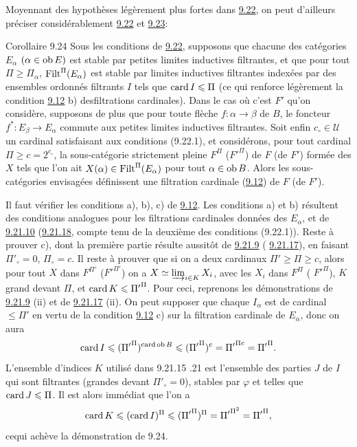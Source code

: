 \documentclass[10pt]{../fichiers-configuration-latex/smfart}
\begin{document}
Moyennant des hypothèses légèrement plus fortes dans
\hyperref[I.them9.22]{9.22}, on peut
d'ailleurs préciser considérablement \hyperref[I.them9.22]{9.22} et
\hyperref[I.cor9.23]{9.23}:

\begin{enonce*}{Corollaire 9.24}
Sous les conditions de \hyperref[I.them9.22]{9.22}, supposons que chacune des
catégories
$E_{\alpha}$ $(\alpha\in \operatorname{ob} E)$ est stable par petites limites
inductives filtrantes, et que pour tout $\Pi\geq \Pi_{\alpha}$,
$\operatorname{Filt}^{\Pi}(E_{\alpha})$ est stable par limites inductives
filtrantes indexées par des ensembles ordonnés filtrants $I$ tels
que $\operatorname{card} I\leqslant \Pi$ (ce qui renforce légèrement la condition
\hyperref[I.def9.12]{9.12} {\rm b)} des\pageoriginale filtrations cardinales). Dans le
cas où c'est $F'$ qu'on considère, supposons de plus que pour toute
flèche $f:\alpha\rightarrow \beta$ de $B$, le foncteur
$f^\ast:E_{\beta}\rightarrow E_{\alpha}$ commute aux petites limites
inductives filtrantes. Soit enfin $c_{\circ}\in 𝒰$ un
cardinal satisfaisant aux conditions (9.22.1), et considérons,
pour tout cardinal $\Pi\geq c=2^{c_{\circ}}$, la sous-catégorie
strictement pleine $F^{\Pi}$ (\resp ${F'}^{\Pi}$) de $F$ (\resp de
$F'$) formée des $X$ tels que l'on ait $X(\alpha)\in
\operatorname{Filt}^{\Pi}(E_{\alpha})$ pour tout $\alpha\in \operatorname{ob} B$. Alors les
sous-catégories envisagées définissent une filtration cardinale
(\hyperref[I.def9.12]{9.12}) de $F$ (\resp de $F'$).
\end{enonce*}

Il faut vérifier les conditions a), b), c) de \hyperref[I.def9.12]{9.12}. Les
conditions
a) et b) résultent des conditions analogues pour les filtrations
cardinales données des $E_{\alpha}$, et de \hyperref[I.lem9.21.10]{9.21.10}
(\resp\hyperref[I.lem9.21.18]{9.21.18},
compte tenu de la deuxième des conditions (9.22.1)). Reste à prouver
c), dont la première partie résulte aussitôt de
\hyperref[I.lem9.21.9]{9.21.9} (\resp
\hyperref[I.lem9.21.17]{9.21.17}), en faisant $\Pi'_{\circ}=0$, $\Pi_{\circ}=c$. Il reste à
prouver que si on a deux cardinaux $\Pi'\geq \Pi\geq c$, alors pour
tout $X$ dans $F^{\Pi'}$ (\resp ${F'}^{\Pi'}$) on a $X\simeq
\varinjlim_{i\in K}X_i$, avec les $X_i$ dans $F^{\Pi}$ (\resp
${F'}^{\Pi}$), $K$ grand devant $\Pi$, et $\operatorname{card} K\leqslant
{\Pi'}^{\Pi}$. Pour ceci, reprenons les démonstrations de
\hyperref[I.lem9.21.9]{9.21.9}
(ii) et de \hyperref[I.lem9.21.17]{9.21.17} (ii). On peut supposer que chaque $I_{\alpha}$
est de cardinal $\leq \Pi'$ en vertu de la condition \hyperref[I.def9.12]{9.12} c) sur la
filtration cardinale de $E_{\alpha}$, donc on aura
$$
\operatorname{card} I\leqslant ({\Pi'}^{\Pi})^{\operatorname{card} \operatorname{ob} B}\leqslant
({\Pi'}^{\Pi})^c={\Pi'}^{\Pi c}={\Pi'}^{\Pi}{}.
$$
L'ensemble d'indices $K$ utilisé dans 9.21.15 .21 est
l'ensemble des parties $J$ de $I$ qui sont filtrantes (\ie grandes
devant $\Pi'_{\circ}=0$), stables par $\varphi$ et telles que $\operatorname{card}
J\leqslant \Pi$. Il est alors immédiat que l'on a
$$
\operatorname{card} K\leqslant (\operatorname{card} I)^{\Pi}\leqslant
({\Pi'}^{\Pi})^{\Pi}={\Pi'}^{\Pi^2}={\Pi'}^{\Pi}{},
$$
ce\pageoriginale qui achève la démonstration de 9.24.
\end{document}
